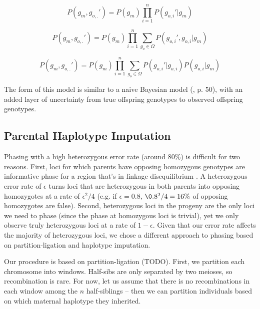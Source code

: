\documentclass[11pt]{article}
\begin{document}
$$
P(g_m, g_{o,.}') = P(g_m) \prod_{i = 1}^n P(g_{o,i}' | g_m)
$$

$$
P(g_m, g_{o,.}') = P(g_m) \prod_{i = 1}^n \sum_{g_o \in \Omega} P(g_{o,i}', g_{o,i} | g_m)
$$

\begin{equation}
  P(g_m, g_{o,.}') = P(g_m) \prod_{i = 1}^n \sum_{g_o \in \Omega} P(g_{o,i}' | g_{o,i}) P(g_{o,i} | g_{m})
\end{equation}

The form of this model is similar to a naive Bayesian model
(\citealt{koller2009}, p. 50), with an added layer of uncertainty from true
offspring genotypes to observed offspring genotypes.

%
%

\subsection{Parental Haplotype Imputation}


Phasing with a high heterozygous error rate (around 80\%) is difficult for two
reasons. First, loci for which parents have opposing homozygous genotypes are
informative phase for a region that's in linkage disequilibrium
\citep{ferdosi2014hsphase}. A heterozygous error rate of $\epsilon$ turns loci
that are heterozygous in both parents into opposing homozygotes at a rate of
$\epsilon^2/4$ (e.g. if $\epsilon = 0.8$, $\0.8^2/4 = 16\%$ of opposing
homozygotes are false). Second, heterozygous loci in the progeny are the only
loci we need to phase (since the phase at homozygous loci is trivial), yet we
only observe truly heterozygous loci at a rate of $1 - \epsilon$. Given that
our error rate affects the majority of heterozygous loci, we chose a different
approach to phasing based on partition-ligation and haplotype imputation.

Our procedure is based on partition-ligation (TODO). First, we partition each
chromosome into windows. Half-sibs are only separated by two meioses, so
recombination is rare. For now, let us assume that there is no recombinations
in each window among the $n$ half-siblings -- then we can partition individuals
based on which maternal haplotype they inherited.
\end{document}
